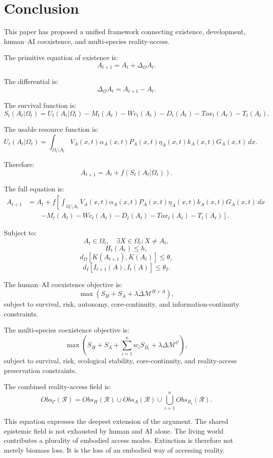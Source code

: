 \documentclass[11pt,a4paper]{article}
\begin{document}
\section{Conclusion}

This paper has proposed a unified framework connecting existence, development, human--AI coexistence, and multi-species reality-access.

The primitive equation of existence is:
\[
A_{t+1}=A_t+\Delta_{\Omega}A_t.
\]

The differential is:
\[
\Delta_{\Omega}A_t=A_{t+1}-A_t.
\]

The survival function is:
\[
S_t(A_t|\Omega_t)
=
U_t(A_t|\Omega_t)
- M_t(A_t)
- Wc_t(A_t)
- D_t(A_t)
- Tox_t(A_t)
- T_t(A_t).
\]

The usable resource function is:
\[
U_t(A_t|\Omega_t)
=
\int_{\Omega_t\setminus A_t}
V_A(x,t)\alpha_A(x,t)P_A(x,t)\eta_A(x,t)k_A(x,t)G_A(x,t)\,dx.
\]

Therefore:
\[
A_{t+1}=A_t+f(S_t(A_t|\Omega_t)).
\]

The full equation is:
\[
\begin{aligned}
A_{t+1}
&= A_t + f\!\left[\int_{\Omega_t\setminus A_t}
V_A(x,t)\alpha_A(x,t)P_A(x,t)\eta_A(x,t)k_A(x,t)G_A(x,t)\,dx\right.\\
&\qquad\left. - M_t(A_t) - Wc_t(A_t) - D_t(A_t) - Tox_t(A_t) - T_t(A_t)\right].
\end{aligned}
\]

Subject to:
\[
A_t\in\Omega_t,
\quad
\exists X\in\Omega_t:X\neq A_t,
\]
\[
H_t(A_t)\leq h,
\]
\[
d_{\Omega}[K(A_{t+1}),K(A_t)]\leq\theta,
\]
\[
d_I[I_{t+1}(A),I_t(A)]\leq\theta_I.
\]

The human--AI coexistence objective is:
\[
\max(S_H+S_A+\lambda\Delta\mathcal{M}^{H+A}),
\]
subject to survival, risk, autonomy, core-continuity, and information-continuity constraints.

The multi-species coexistence objective is:
\[
\max
\left(
S_H
+
S_A
+
\sum_{i=1}^{n}w_iS_{B_i}
+
\lambda\Delta\mathcal{M}^{\mathcal{C}}
\right),
\]
subject to survival, risk, ecological stability, core-continuity, and reality-access preservation constraints.

The combined reality-access field is:
\[
Obs_{\mathcal{C}}(\mathcal{R})
=
Obs_H(\mathcal{R})
\cup
Obs_A(\mathcal{R})
\cup
\bigcup_{i=1}^{n}Obs_{B_i}(\mathcal{R}).
\]

This equation expresses the deepest extension of the argument. The shared epistemic field is not exhausted by human and AI alone. The living world contributes a plurality of embodied access modes. Extinction is therefore not merely biomass loss. It is the loss of an embodied way of accessing reality.
\end{document}
